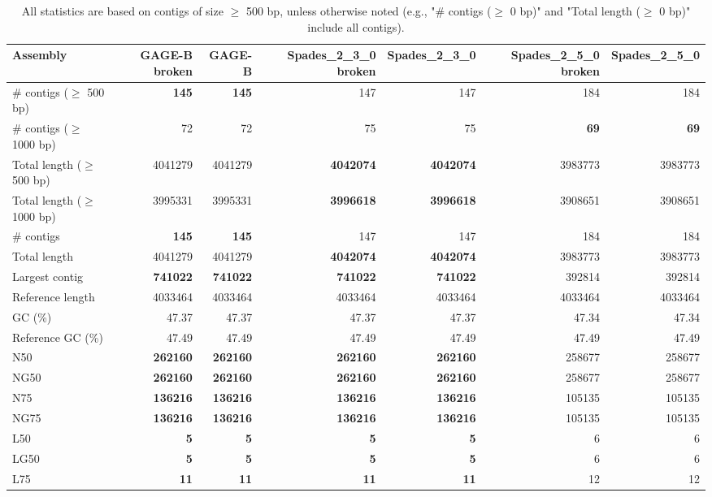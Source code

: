 \documentclass[12pt,a4paper]{article}
\begin{document}
\begin{table}[ht]
\begin{center}
\caption{All statistics are based on contigs of size $\geq$ 500 bp, unless otherwise noted (e.g., "\# contigs ($\geq$ 0 bp)" and "Total length ($\geq$ 0 bp)" include all contigs).}
\begin{tabular}{|l*{6}{|r}|}
\hline
Assembly & GAGE-B broken & GAGE-B & Spades\_2\_3\_0 broken & Spades\_2\_3\_0 & Spades\_2\_5\_0 broken & Spades\_2\_5\_0 \\ \hline
\# contigs ($\geq$ 500 bp) & {\bf 145} & {\bf 145} & 147 & 147 & 184 & 184 \\ \hline
\# contigs ($\geq$ 1000 bp) & 72 & 72 & 75 & 75 & {\bf 69} & {\bf 69} \\ \hline
Total length ($\geq$ 500 bp) & 4041279 & 4041279 & {\bf 4042074} & {\bf 4042074} & 3983773 & 3983773 \\ \hline
Total length ($\geq$ 1000 bp) & 3995331 & 3995331 & {\bf 3996618} & {\bf 3996618} & 3908651 & 3908651 \\ \hline
\# contigs & {\bf 145} & {\bf 145} & 147 & 147 & 184 & 184 \\ \hline
Total length & 4041279 & 4041279 & {\bf 4042074} & {\bf 4042074} & 3983773 & 3983773 \\ \hline
Largest contig & {\bf 741022} & {\bf 741022} & {\bf 741022} & {\bf 741022} & 392814 & 392814 \\ \hline
Reference length & 4033464 & 4033464 & 4033464 & 4033464 & 4033464 & 4033464 \\ \hline
GC (\%) & 47.37 & 47.37 & 47.37 & 47.37 & 47.34 & 47.34 \\ \hline
Reference GC (\%) & 47.49 & 47.49 & 47.49 & 47.49 & 47.49 & 47.49 \\ \hline
N50 & {\bf 262160} & {\bf 262160} & {\bf 262160} & {\bf 262160} & 258677 & 258677 \\ \hline
NG50 & {\bf 262160} & {\bf 262160} & {\bf 262160} & {\bf 262160} & 258677 & 258677 \\ \hline
N75 & {\bf 136216} & {\bf 136216} & {\bf 136216} & {\bf 136216} & 105135 & 105135 \\ \hline
NG75 & {\bf 136216} & {\bf 136216} & {\bf 136216} & {\bf 136216} & 105135 & 105135 \\ \hline
L50 & {\bf 5} & {\bf 5} & {\bf 5} & {\bf 5} & 6 & 6 \\ \hline
LG50 & {\bf 5} & {\bf 5} & {\bf 5} & {\bf 5} & 6 & 6 \\ \hline
L75 & {\bf 11} & {\bf 11} & {\bf 11} & {\bf 11} & 12 & 12 \\ \hline

\end{tabular}
\end{center}
\end{table}
\end{document}
